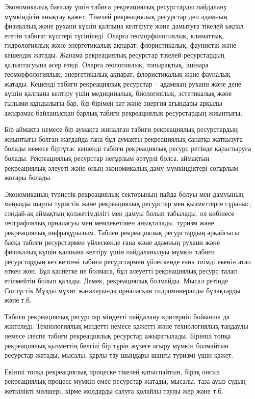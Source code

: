 \begin{multicols}{2}
Экономикалық бағалау үшін табиғи рекреациялық ресурстарды пайдалану
мүмкіндігін анықтау қажет. Тікелей рекреациялық ресурстар деп адамның
физикалық және рухани күшін қалпына келтіруге және дамытуға тікелей
ықпал ететін табиғат күштері түсініледі. Оларға геоморфологиялық,
климаттық, гидрологиялық және энергетикалық ақпарат, флористикалық,
фаунистік және кешендік жатады. Жанама рекреациялық ресурстар тікелей
ресурстардың қалыптасуына әсер етеді. Оларға геологиялық, топырақтық,
ішінара геоморфологиялық, энергетикалық ақпарат, флористикалық және
фауналық жатады. Кешенді табиғи рекреациялық ресурстар -- адамның рухани
және дене күшін қалпына келтіру үшін медициналық, биологиялық,
эстетикалық және ғылыми құндылығы бар, бір-бірімен зат және энергия
ағындары арқылы ажырамас байланысқан барлық табиғи рекреациялық
ресурстардың жиынтығы.

Бір аймақта немесе бір аумақта жиналған табиғи рекреациялық ресурстардың
жиынтығы болған жағдайда ғана бұл аумақты рекреациялық санатқа жатқызуға
болады немесе біртұтас кешенді табиғи рекреациялық ресурс ретінде
қарастыруға болады. Рекреациялық ресурстар неғұрлым әртүрлі болса,
аймақтың рекреациялық әлеуеті және оның экономикалық даму мүмкіндіктері
соғұрлым жоғары болады.

Экономиканың туристік-рекреациялық секторының пайда болуы мен дамуының
маңызды шарты туристік және рекреациялық ресурстар мен қызметтерге
сұраныс, сондай-ақ аймақтың қолжетімділігі мен дамуы болып табылады, ол
көбінесе географиялық орналасуы мен мемлекетімен анықталады. туризм және
рекреациялық инфрақұрылым. Табиғи рекреациялық ресурстардың әрқайсысы
басқа табиғи ресурстармен үйлескенде ғана және адамның рухани және
физикалық күшін қалпына келтіру үшін пайдаланылуы мүмкін табиғи
ресурстардың кез келгені табиғи ресурстармен үйлескенде ғана тиімді
екенін атап өткен жөн. Бұл қасиетке ие болмаса, бұл әлеуетті
рекреациялық ресурс талап етілмейтін болып қалады. Демек, рекреациялық
болмайды. Мысал ретінде Солтүстік Мұзды мұхит жағалауында орналасқан
гидроминералды бұлақтарды және т.б.

Табиғи рекреациялық ресурстар міндетті пайдалану критерийі бойынша да
жіктеледі. Технологиялық міндетті немесе қажетті және технологиялық
таңдаулы немесе ілеспе табиғи рекреациялық ресурстар ажыратылады.
Бірінші топқа рекреациялық қызметтің белгілі бір түрін жүзеге асыру
мүмкін болмайтын ресурстар жатады, мысалы, қарлы тау шыңдары шаңғы
туризмі үшін қажет.

Екінші топқа рекреациялық процеске тікелей қатыспайтын, бірақ онсыз
рекреациялық процесс мүмкін емес ресурстар жатады, мысалы, таза ауыз
судың жеткілікті мөлшері, кірме жолдарды салуға қолайлы таулы жер және
т.б.


\end{multicols}
